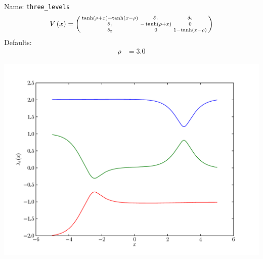 \documentclass[a4paper,10pt]{report}
\begin{document}
\begin{minipage}{0.75\linewidth}
  Name:    \texttt{three\_levels}
  \begin{equation*}
    V\left( x \right) = \left(\begin{smallmatrix}\operatorname{tanh}\left(\rho + x\right) + \operatorname{tanh}\left(x - \rho\right) & \delta_{1} & \delta_{2}\\\delta_{1} & - \operatorname{tanh}\left(\rho + x\right) & 0\\\delta_{2} & 0 & 1 - \operatorname{tanh}\left(x - \rho\right)\end{smallmatrix}\right)
  \end{equation*}
  Defaults:
  \begin{align*}
    \rho & = 3.0
  \end{align*}
\end{minipage}
\begin{minipage}{0.25\linewidth}
  \begin{center}
    \includegraphics[scale=0.25]{./fig/three_levels.pdf}
  \end{center}
\end{minipage}
\end{document}
